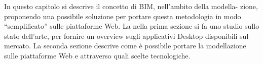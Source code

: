 In questo capitolo si descrive il concetto di BIM, nell’ambito della modella-
zione, proponendo una possibile soluzione per portare questa metodologia in modo ``semplificato'' sulle piattaforme Web.
La nella prima sezione si fa uno studio sullo stato dell’arte, per fornire un overview
sugli applicativi Desktop disponibili sul mercato. La seconda sezione descrive come è
possibile portare la modellazione sulle piattaforme Web e attraverso quali scelte tecnologiche.
